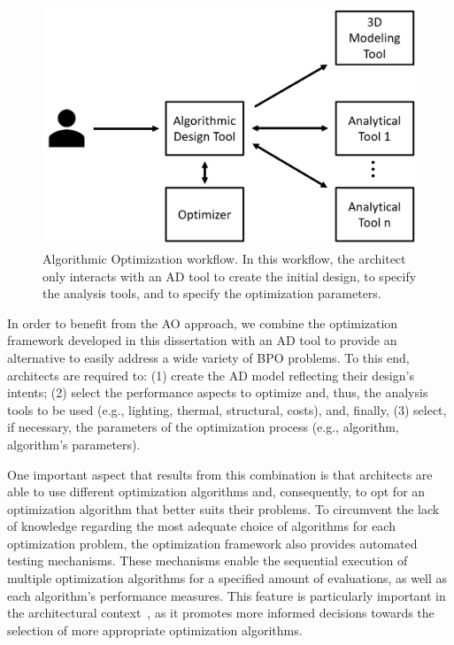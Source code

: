 \begin{figure}[htbp]
	\centering
	\includegraphics[width=\columnwidth]{../report/Images/Solution/algorithmic_optimization.png}
	\caption{Algorithmic Optimization workflow. In this workflow, the architect only interacts with an \ac{AD} tool to create the initial design, to specify the analysis tools, and to specify the optimization parameters.}
	\label{fig:algorithmicoptimization}
\end{figure}

In order to benefit from the \ac{AO} approach, we combine the optimization framework developed in this dissertation with an \ac{AD} tool to provide an alternative to easily address a wide variety of \ac{BPO} problems. To this end, architects are required to: (1) create the \ac{AD} model reflecting their design's intents; (2) select the performance aspects to optimize and, thus, the analysis tools to be used (e.g., lighting, thermal, structural, costs), and, finally, (3) select, if necessary, the parameters of the optimization process (e.g., algorithm, algorithm's parameters).

One important aspect that results from this combination is that architects are able to use different optimization algorithms and, consequently, to opt for an optimization algorithm that better suits their problems. To circumvent the lack of knowledge regarding the most adequate choice of algorithms for each optimization problem, the optimization framework also provides automated testing mechanisms. These mechanisms enable the sequential execution of multiple optimization algorithms for a specified amount of evaluations, as well as each algorithm's performance measures. This feature is particularly important in the architectural context~\cite{Wortmann2016BBO,Hamdy2016}, as it promotes more informed decisions towards the selection of more appropriate optimization algorithms.

